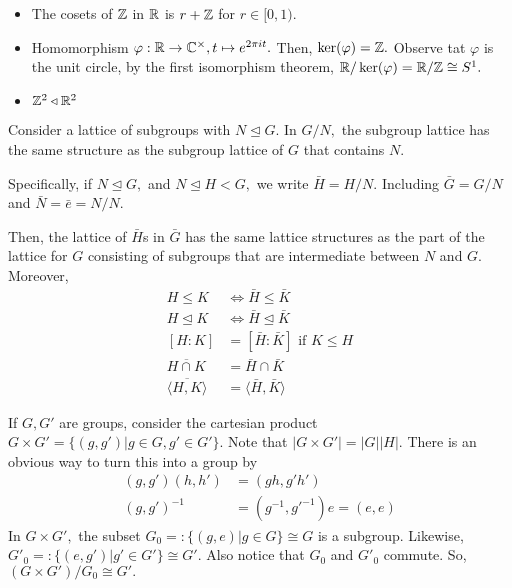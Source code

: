 \documentclass[a4paper]{article}
\begin{document}
\begin{itemize}
    \item The cosets of $\mathbb{Z}$ in $\mathbb{R}$ is $r+\mathbb{Z}$ for $r\in[0,1).$
    \item Homomorphism $\varphi:\mathbb{R}\to\mathbb{C}^\times, t\mapsto e^{2\pi it}.$ Then, $\ker(\varphi)=\mathbb{Z}.$ Observe tat $\varphi$ is  the unit circle, by the first isomorphism theorem, $\mathbb{R}/\ker(\varphi)=\mathbb{R}/\mathbb{Z}\cong S^1.$
    \item $\mathbb{Z}^2\triangleleft\mathbb{R}^2$
\end{itemize}
\begin{theorem}
    Consider a lattice of subgroups with $N\trianglelefteq G.$ In $G/N,$ the subgroup lattice has the same structure as the subgroup lattice of $G$ that contains $N.$

    Specifically, if $N\trianglelefteq G,$ and $N\trianglelefteq H<G,$ we write $\bar H=H/N.$ Including $\bar G=G/N$ and $\bar N=\bar e=N/N.$

    Then, the lattice of $\bar H$s in $\bar G$ has the same lattice structures as the part of the lattice for $G$ consisting of subgroups that are intermediate between $N$ and $G.$ Moreover,\begin{align}
        H\leq K&\iff\bar H\leq\bar K\\
        H\trianglelefteq K&\iff\bar H\trianglelefteq\bar K\\
        [H:K]&=[\bar H:\bar K] \text{ if }K\leq H\\
        \overline{H\cap K}&=\bar H\cap\bar K\\
        \overline{\langle H,K\rangle}&=\langle\bar H,\bar K\rangle
    \end{align}
\end{theorem}
If $G,G'$ are groups, consider the cartesian product $G\times G'=\{(g,g')|g\in G,g'\in G'\}.$ Note that $|G\times G'|=|G||H|.$ There is an obvious way to turn this into a group by\begin{align}
    (g,g')(h,h')&=(gh,g'h')\\
    (g,g')^{-1}&=(g^{-1},g'^{-1})
    e=(e,e)
\end{align}
In $G\times G',$ the subset $G_0=:\{(g,e)|g\in G\}\cong G$ is a subgroup. Likewise, $G'_0=:\{(e,g')|g'\in G'\}\cong G'.$ Also notice that $G_0$ and $G'_0$ commute. So, $(G\times G')/G_0\cong G'.$
\end{document}
